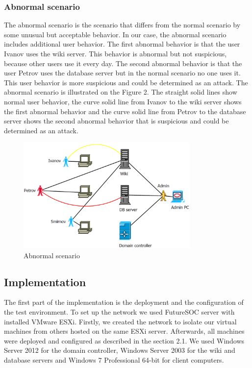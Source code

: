 \subsubsection{Abnormal scenario}
The abnormal scenario is the scenario that differs from the normal scenario by some unusual but acceptable behavior. In our case, the abnormal scenario includes additional user behavior. The first abnormal behavior is that the user Ivanov uses the wiki server. This behavior is abnormal but not suspicious, because other users use it every day. The second abnormal behavior is that the user Petrov uses the database server but in the normal scenario no one uses it. This user behavior is more suspicious and could be determined as an attack. The abnormal scenario is illustrated on the Figure 2. The straight solid lines show normal user behavior, the curve solid line from Ivanov to the wiki server shows the first abnormal behavior and the curve solid line from Petrov to the database server shows the second abnormal behavior that is suspicious and could be determined as an attack. 
\begin{figure}[ht!]
\centering
\includegraphics[width=0.8\textwidth]{scenario_abnormal.png}
\caption{Abnormal scenario}
\label{overflow}
\end{figure}

\subsection{Implementation}
The first part of the implementation is the deployment and the configuration of the test environment. To set up the network we used FutureSOC server with installed VMware ESXi. Firstly, we created the network to isolate our virtual machines from others hosted on the same ESXi server. Afterwards, all machines were deployed and configured as described in the section 2.1. We used Windows Server 2012 for the domain controller, Windows Server 2003 for the wiki and database servers and Windows 7 Professional 64-bit for client computers. 

